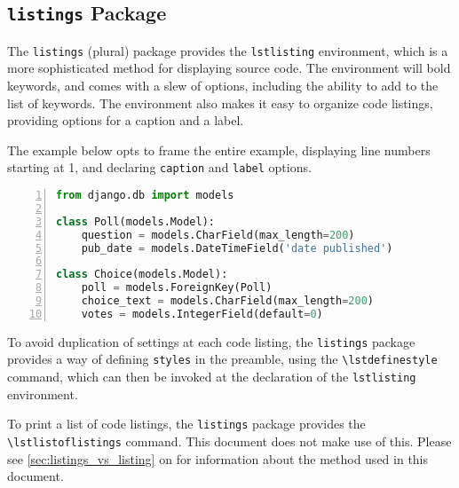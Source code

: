 
\subsection{\texttt{listings} Package}

The \verb|listings| (plural) package provides the \verb|lstlisting| environment, which is a more sophisticated method for displaying source code. The environment will bold keywords, and comes with a slew of options, including the ability to add to the list of keywords. The environment also makes it easy to organize code listings, providing options for a caption and a label.

The example below opts to frame the entire example, displaying line numbers starting at 1, and declaring \verb|caption| and \verb|label| options.

\begin{lstlisting}[aboveskip=\baselineskip,%
                   basicstyle=\ttfamily,%
                   belowskip=\baselineskip,%
                   caption={[Listings Example]
                            \lstinline{models.py} from Django Tutorial using Listings},%
                   columns=fixed,%
                   firstnumber=1,%
                   frame=single,%
                   label=code:django:models_basic_listing,%
                   language=Python,%
                   numbers=left,%
                   showstringspaces=false,%
                   showspaces=false]
from django.db import models

class Poll(models.Model):
    question = models.CharField(max_length=200)
    pub_date = models.DateTimeField('date published')

class Choice(models.Model):
    poll = models.ForeignKey(Poll)
    choice_text = models.CharField(max_length=200)
    votes = models.IntegerField(default=0)
\end{lstlisting}

To avoid duplication of settings at each code listing, the \verb|listings| package provides a way of defining \verb|styles| in the preamble, using the \verb|\lstdefinestyle| command, which can then be invoked at the declaration of the \verb|lstlisting| environment.

To print a list of code listings, the \verb|listings| package provides the \verb|\lstlistoflistings| command. This document does not make use of this. Please see \autoref{sec:listings_vs_listing} on  for information about the method used in this document.

